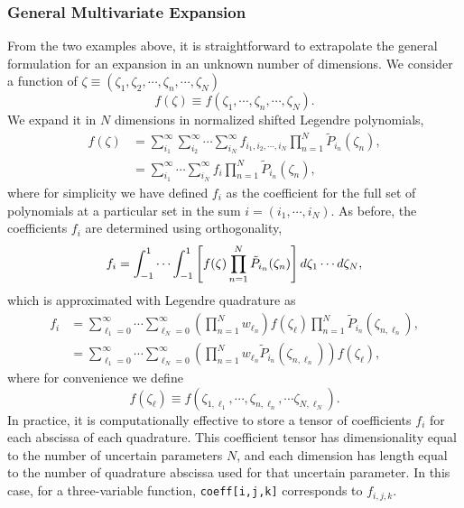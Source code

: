 \subsubsection{General Multivariate Expansion}
From the two examples above, it is straightforward to extrapolate the general formulation for an expansion in an unknown number of dimensions.  We consider a function of $\zeta\equiv(\zeta_1,\zeta_2,\cdots,\zeta_n,\cdots, \zeta_N)$
\begin{equation}
f(\zeta)\equiv f(\zeta_1,\cdots,\zeta_n,\cdots, \zeta_N).
\end{equation}
We expand it in $N$ dimensions in normalized shifted Legendre polynomials,
\begin{align}
f(\zeta)&=\sum_{i_1}^\infty \sum_{i_2}^\infty \cdots\sum_{i_N}^\infty 
        f_{i_1,i_2,\cdots,i_N} \prod_{n=1}^N \tilde P_{i_n}(\zeta_n),\\
 &=\sum_{i_1}^\infty \cdots\sum_{i_N}^\infty
        f_{i} \prod_{n=1}^N \tilde P_{i_n}(\zeta_n),
\end{align}
where for simplicity we have defined $f_i$ as the coefficient for the full set of polynomials at a particular set in the sum $i=(i_1,\cdots,i_N)$.  As before, the coefficients $f_i$ are determined using orthogonality,
\begin{equation}
f_i=\int_{-1}^1 \cdots \int_{-1}^1 \left[f(\zeta)\prod_{n=1}^N \tilde P_{i_n}(\zeta_n)\right] d\zeta_1\cdots d\zeta_N,
\end{equation}
which is approximated with Legendre quadrature as
\begin{align}
f_i&=\sum_{\ell_1=0}^\infty\cdots\sum_{\ell_N=0}^\infty \left(\prod_{n=1}^N w_{\ell_n}\right) 
              f(\zeta_\ell)\prod_{n=1}^N \tilde P_{i_n}(\zeta_{n,\ell_n}),\\
  &=\sum_{\ell_1=0}^\infty\cdots\sum_{\ell_N=0}^\infty \left(\prod_{n=1}^N w_{\ell_n}\tilde P_{i_n}(\zeta_{n,\ell_n})\right) 
              f(\zeta_\ell), 
\end{align}
where for convenience we define
\begin{equation}
f(\zeta_\ell)\equiv f(\zeta_{1,\ell_1},\cdots,\zeta_{n,\ell_n},\cdots\zeta_{N,\ell_N}).
\end{equation}
In practice, it is computationally effective to store a tensor of coefficients $f_i$ for each abscissa of each quadrature.  This coefficient tensor has dimensionality equal to the number of uncertain parameters $N$, and each dimension has length equal to the number of quadrature abscissa used for that uncertain parameter.  In this case, for a three-variable function, \texttt{coeff[i,j,k]} corresponds to $f_{i,j,k}$.

